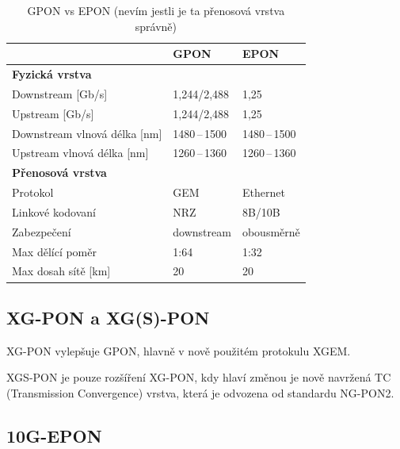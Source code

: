 \clearpage

\begin{table}[ht]
    \centering
    \caption{GPON vs EPON (nevím jestli je ta přenosová vrstva správně)}
    \begin{tabular}{|l|l|l|}
        \hline
                                     & GPON           & EPON           \\\hline\hline
        \textbf{Fyzická vrstva}      &                &                \\\hline\hline
        Downstream [Gb/s]            & 1,244/2,488    & 1,25           \\\hline
        Upstream [Gb/s]              & 1,244/2,488    & 1,25           \\\hline
        Downstream vlnová délka [nm] & 1480\,--\,1500 & 1480\,--\,1500 \\\hline
        Upstream vlnová délka [nm]   & 1260\,--\,1360 & 1260\,--\,1360 \\\hline\hline
        \textbf{Přenosová vrstva}    &                &                \\\hline\hline
        Protokol                     & GEM            & Ethernet       \\\hline
        Linkové kodovaní             & NRZ            & 8B/10B         \\\hline
        Zabezpečení                  & downstream     & obousměrně     \\\hline
        Max dělící poměr             & 1:64           & 1:32           \\\hline
        Max dosah sítě [km]          & 20             & 20             \\\hline
    \end{tabular}
\end{table}

\subsection{XG-PON a XG(S)-PON}

XG-PON vylepšuje GPON, hlavně v nově použitém protokulu XGEM.

XGS-PON je pouze rozšíření XG-PON, kdy hlaví změnou je nově navržená TC (Transmission Convergence) vrstva, která je odvozena od standardu NG-PON2.

\subsection{10G-EPON}

